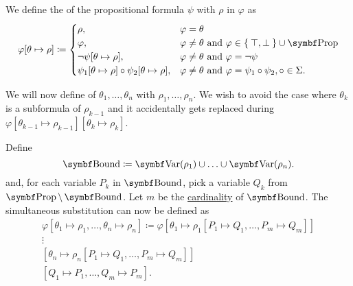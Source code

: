 \begin{definition}\label{def:propositional_substitution}\mbox{}
  \begin{DefEnum}
     We define the  of the propositional formula \( \psi \) with \( \rho \) in \( \varphi \) as
    \begin{equation}\label{eq:def:propositional_substitution/single}
      \varphi[\theta \mapsto \rho] \coloneqq \begin{cases}
        \rho,                                                          &\varphi = \theta \\
        \varphi,                                                       &\varphi \neq \theta \T{and} \varphi \in \Set{ \top, \bot } \cup \Bold{Prop} \\
        \neg \psi[\theta \mapsto \rho],                                &\varphi \neq \theta \T{and} \varphi = \neg \psi \\
        \psi_1[\theta \mapsto \rho] \circ \psi_2[\theta \mapsto \rho], &\varphi \neq \theta \T{and} \varphi = \psi_1 \circ \psi_2, \circ \in \Sigma.
      \end{cases}
    \end{equation}

     We will now define  of \( \theta_1, \ldots, \theta_n \) with \( \rho_1, \ldots, \rho_n \). We wish to avoid the case where \( \theta_k \) is a subformula of \( \rho_{k-1} \) and it accidentally gets replaced during \( \varphi[\theta_{k-1} \mapsto \rho_{k-1}][\theta_k \mapsto \rho_k] \).

    Define
    \begin{equation*}
      \Cat{Bound} \coloneqq \Bold{Var}(\rho_1) \cup \ldots \cup \Bold{Var}(\rho_n).
    \end{equation*}
    and, for each variable \( P_k \) in \( \Cat{Bound} \), pick a variable \( Q_k \) from \( \Bold{Prop} \setminus \Bold{Bound} \). Let \( m \) be the \hyperref[def:cardinal]{cardinality} of \( \Bold{Bound} \). The simultaneous substitution can now be defined as
    \begin{align*}
      \varphi[\theta_1 \mapsto \rho_1, \ldots, \theta_n \mapsto \rho_n] \coloneqq \varphi
      [\theta_1 \mapsto \rho_1[P_1 \mapsto Q_1, \ldots, P_m \mapsto Q_m]] \\
      \vdots \hspace{3cm} \\
      [\theta_n \mapsto \rho_n[P_1 \mapsto Q_1, \ldots, P_m \mapsto Q_m]] \\
      [Q_1 \mapsto P_1, \ldots, Q_m \mapsto P_m].
    \end{align*}
  \end{DefEnum}
\end{definition}

